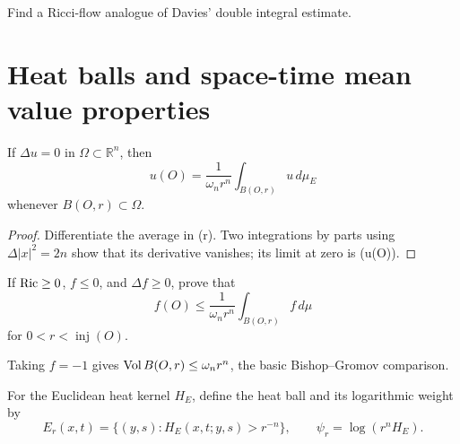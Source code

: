 \begin{claim}
\label{clm:chow-iii-ricci-flow-davies-estimate-problem}
Find a Ricci-flow analogue of Davies' double integral estimate.
\end{claim}

\section{Heat balls and space-time mean value properties}

\begin{theorem}
\label{thm:chow-iii-euclidean-harmonic-mean-value-property}
If \(\Delta u=0\) in \(\Omega\subset\mathbb R^n\), then
\[
 u(O)=\frac1{\omega_nr^n}\int_{B(O,r)}u\,d\mu_E
\]
whenever \(B(O,r)\subset\Omega\).
\end{theorem}
\begin{proof}
Differentiate the average in (r).  Two integrations by parts using
\(\Delta|x|^2=2n\) show that its derivative vanishes; its limit at zero is
(u(O)).
\end{proof}

\begin{claim}
\label{clm:chow-iii-nonpositive-subharmonic-mean-value-exercise}
If \(\operatorname{Ric}\ge0\), \(f\le0\), and \(\Delta f\ge0\), prove that
\[
 f(O)\le\frac1{\omega_nr^n}\int_{B(O,r)}f\,d\mu
\]
for \(0<r<\operatorname{inj}(O)\).
\end{claim}

\begin{remark}
\label{rem:chow-iii-nonnegative-ricci-euclidean-volume-bound}
Taking \(f=-1\) gives \(\operatorname{Vol} B(O,r)\le\omega_nr^n\), the basic
Bishop--Gromov comparison.
\end{remark}

For the Euclidean heat kernel \(H_E\), define the heat ball and its logarithmic
weight by
\[
 E_r(x,t)=\{(y,s):H_E(x,t;y,s)>r^{-n}\},
 \qquad \psi_r=\log(r^nH_E).
\]

